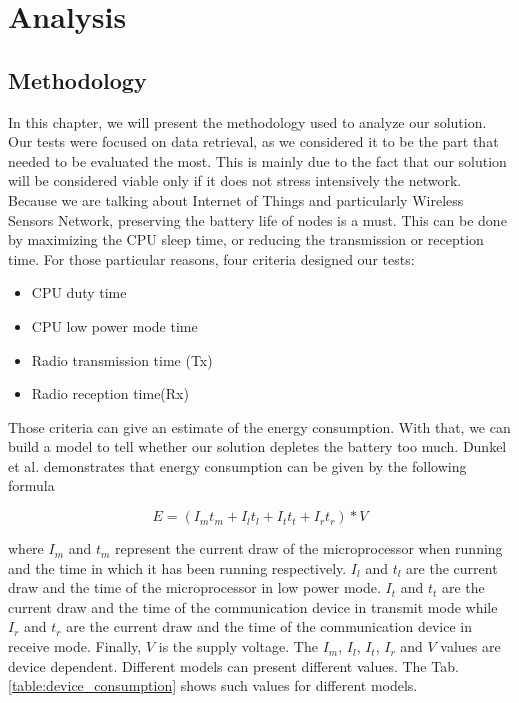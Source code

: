\part{Analysis}  \label{part:analysis}

\chapter{Methodology}

In this chapter, we will present the methodology used to analyze our solution. Our tests were focused on data retrieval, as we considered it to be the part that needed to be evaluated the most. This is mainly due to the fact that our solution will be considered viable only if it does not stress intensively the network. Because we are talking about Internet of Things and particularly Wireless Sensors Network, preserving the battery life of nodes is a must. This can be done by maximizing the CPU sleep time, or reducing the transmission or reception time. For those particular reasons, four criteria designed our tests:

\begin{itemize}
  \item CPU duty time
  \item CPU low power mode time
  \item Radio transmission time (Tx)
  \item Radio reception time(Rx)\\
\end{itemize}

Those criteria can give an estimate of the energy consumption. With that, we can build a model to tell whether our solution depletes the battery too much. Dunkel et al. \cite{dunkels2007software} demonstrates that energy consumption can be given by the following formula

\begin{equation}
  E = (I_m t_m + I_l t_l + I_t t_t + I_r t_r) * V
\end{equation}

where $I_m$ and $t_m$ represent the current draw of the microprocessor when running and the time in which it has been running respectively. $I_l$ and $t_l$  are the current draw and the time of the microprocessor in low power mode. $I_t$ and $t_t$ are the current draw and the time of the communication device in transmit mode while $I_r$ and $t_r$ are the current draw and the time of the communication device in receive mode. Finally, $V$ is the supply voltage. The $I_m$, $I_l$, $I_t$, $I_r$ and $V$ values are device dependent. Different models can present different values. The Tab.\ref{table:device_consumption} shows such values for different models.\\

